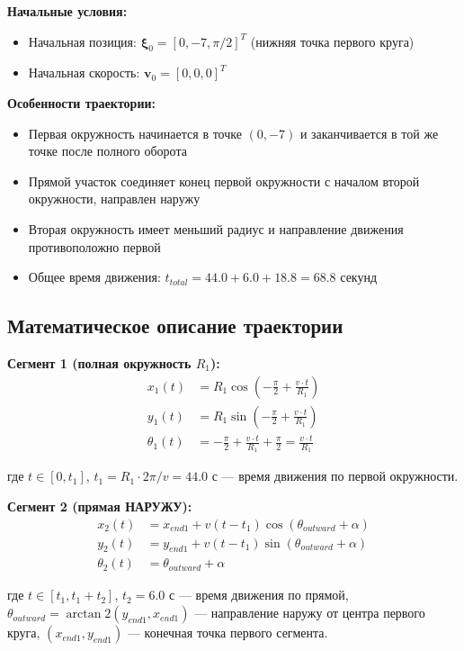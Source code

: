 \textbf{Начальные условия:}
\begin{itemize}
\item Начальная позиция: $\boldsymbol{\xi}_0 = [0, -7, \pi/2]^T$ (нижняя точка первого круга)
\item Начальная скорость: $\mathbf{v}_0 = [0, 0, 0]^T$
\end{itemize}

\textbf{Особенности траектории:}
\begin{itemize}
\item Первая окружность начинается в точке $(0, -7)$ и заканчивается в той же точке после полного оборота
\item Прямой участок соединяет конец первой окружности с началом второй окружности, направлен наружу
\item Вторая окружность имеет меньший радиус и направление движения противоположно первой
\item Общее время движения: $t_{total} = 44.0 + 6.0 + 18.8 = 68.8$ секунд
\end{itemize}

\subsection{Математическое описание траектории}

\textbf{Сегмент 1 (полная окружность $R_1$):}
\begin{align}
x_1(t) &= R_1 \cos\left(-\frac{\pi}{2} + \frac{v \cdot t}{R_1}\right) \\
y_1(t) &= R_1 \sin\left(-\frac{\pi}{2} + \frac{v \cdot t}{R_1}\right) \\
\theta_1(t) &= -\frac{\pi}{2} + \frac{v \cdot t}{R_1} + \frac{\pi}{2} = \frac{v \cdot t}{R_1}
\end{align}

где $t \in [0, t_1]$, $t_1 = R_1 \cdot 2\pi / v = 44.0$ с --- время движения по первой окружности.

\textbf{Сегмент 2 (прямая НАРУЖУ):}
\begin{align}
x_2(t) &= x_{end1} + v(t - t_1)\cos(\theta_{outward} + \alpha) \\
y_2(t) &= y_{end1} + v(t - t_1)\sin(\theta_{outward} + \alpha) \\
\theta_2(t) &= \theta_{outward} + \alpha
\end{align}

где $t \in [t_1, t_1 + t_2]$, $t_2 = 6.0$ с --- время движения по прямой,
$\theta_{outward} = \arctan2(y_{end1}, x_{end1})$ --- направление наружу от центра первого круга,
$(x_{end1}, y_{end1})$ --- конечная точка первого сегмента.

